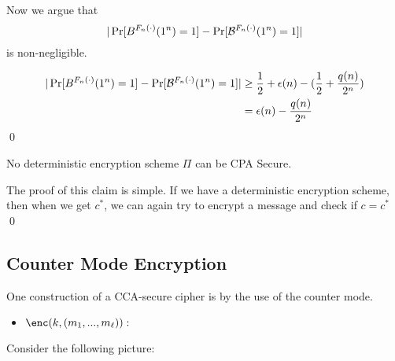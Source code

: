 Now we argue that 
$$|\Pr[B^{F_n(\cdot)}(1^n) = 1] - \Pr[\mathcal{B}^{F_n(\cdot)}(1^n) = 1]|$$
is non-negligible.

\begin{align*}
    |\Pr[B^{F_n(\cdot)}(1^n) = 1] - \Pr[\mathcal{B}^{F_n(\cdot)}(1^n) = 1]| &\ge \frac{1}{2} + \epsilon(n) - (\frac{1}{2} + \frac{q(n)}{2^n}) \\
    &= \epsilon(n) - \frac{q(n)}{2^n}
\end{align*}
\qed

\begin{theorem}
    No deterministic encryption scheme $\Pi$ can be CPA Secure.
\end{theorem}

\proof
The proof of this claim is simple.
If we have a deterministic encryption scheme, then when we get $c^*$, we can again try to encrypt a message and check if $c = c^*$
\qed


\subsection{Counter Mode Encryption}
One construction of a CCA-secure cipher is by the use of the counter mode.

\begin{itemize}
    \item $\enc(k, (m_1,...,m_\ell)):$
\end{itemize}

Consider the following picture:

\begin{center}
\end{center}

